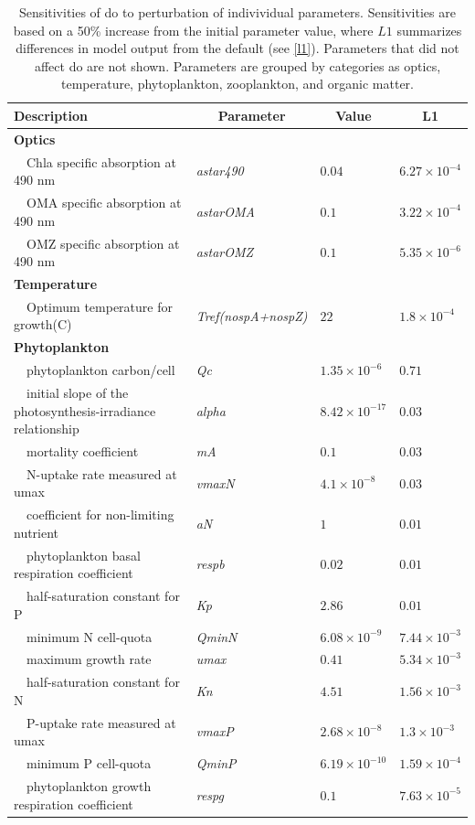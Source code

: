 \documentclass[letterpaper,12pt,oneside]{article}\usepackage[]{graphicx}\usepackage[]{color}
\begin{document}
\begin{table}[!tbp]
{\footnotesize
\caption{Sensitivities of \ac{do} to perturbation of indivividual parameters.  Sensitivities are based on a 50\% increase from the initial parameter value, where $L1$ summarizes differences in model output from the default (see \cref{l1}).  Parameters that did not affect \ac{do} are not shown.  Parameters are grouped by categories as optics, temperature, phytoplankton, zooplankton, and organic matter.\label{tab:dosens}} 
\begin{center}
\begin{tabular}{llll}
\hline\hline
\multicolumn{1}{l}{Description}&\multicolumn{1}{c}{Parameter}&\multicolumn{1}{c}{Value}&\multicolumn{1}{c}{L1}\tabularnewline
\hline
{\bfseries Optics}&&&\tabularnewline
~~Chla specific absorption at 490 nm&\textit{astar490}&$0.04$&$6.27\times 10^{-4}$\tabularnewline
~~OMA specific absorption at 490 nm&\textit{astarOMA}&$0.1$&$3.22\times 10^{-4}$\tabularnewline
~~OMZ specific absorption at 490 nm&\textit{astarOMZ}&$0.1$&$5.35\times 10^{-6}$\tabularnewline
\hline
{\bfseries Temperature}&&&\tabularnewline
~~Optimum temperature for growth(C)&\textit{Tref(nospA+nospZ)}&$22$&$1.8\times 10^{-4}$\tabularnewline
\hline
{\bfseries Phytoplankton}&&&\tabularnewline
~~phytoplankton carbon/cell&\textit{Qc}&$1.35\times 10^{-6}$&$0.71$\tabularnewline
~~initial slope of the photosynthesis-irradiance relationship&\textit{alpha}&$8.42\times 10^{-17}$&$0.03$\tabularnewline
~~mortality coefficient&\textit{mA}&$0.1$&$0.03$\tabularnewline
~~N-uptake rate measured at umax&\textit{vmaxN}&$4.1\times 10^{-8}$&$0.03$\tabularnewline
~~coefficient for non-limiting nutrient&\textit{aN}&$1$&$0.01$\tabularnewline
~~phytoplankton basal respiration coefficient&\textit{respb}&$0.02$&$0.01$\tabularnewline
~~half-saturation constant for P&\textit{Kp}&$2.86$&$0.01$\tabularnewline
~~minimum N cell-quota&\textit{QminN}&$6.08\times 10^{-9}$&$7.44\times 10^{-3}$\tabularnewline
~~maximum growth rate&\textit{umax}&$0.41$&$5.34\times 10^{-3}$\tabularnewline
~~half-saturation constant for N&\textit{Kn}&$4.51$&$1.56\times 10^{-3}$\tabularnewline
~~P-uptake rate measured at umax&\textit{vmaxP}&$2.68\times 10^{-8}$&$1.3\times 10^{-3}$\tabularnewline
~~minimum P cell-quota&\textit{QminP}&$6.19\times 10^{-10}$&$1.59\times 10^{-4}$\tabularnewline
~~phytoplankton growth respiration coefficient&\textit{respg}&$0.1$&$7.63\times 10^{-5}$\tabularnewline

\end{tabular}
\end{center}}
\end{table}
\end{document}
